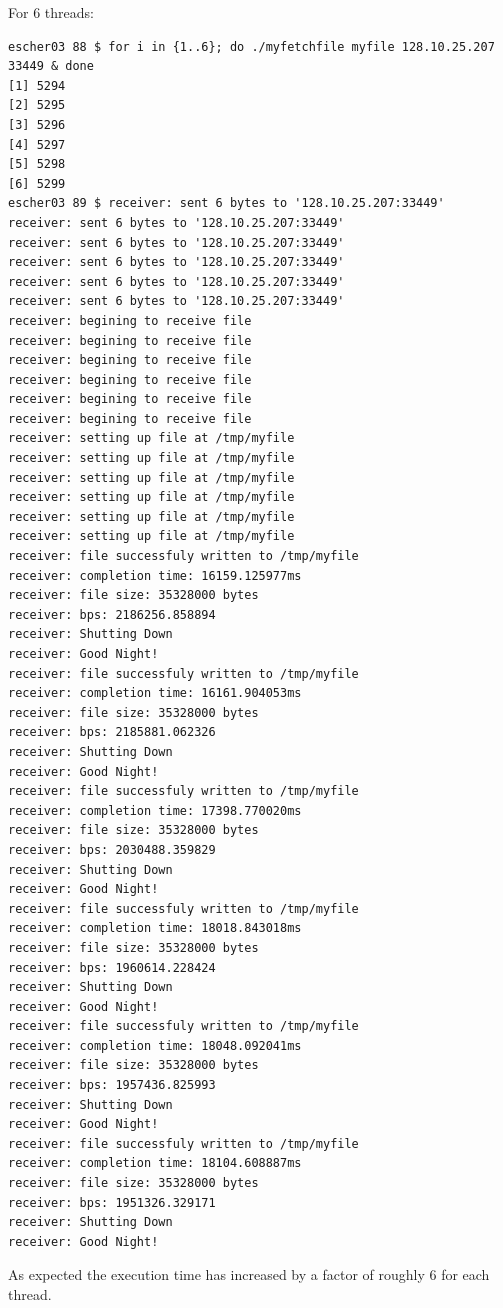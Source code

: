 \documentclass[paper=a4, fontsize=11pt]{scrartcl}
\numberwithin{equation}{section}		%
\numberwithin{figure}{section}			%
\numberwithin{table}{section}				%
\begin{document}
For 6 threads:
\begin{verbatim}
escher03 88 $ for i in {1..6}; do ./myfetchfile myfile 128.10.25.207 33449 & done
[1] 5294
[2] 5295
[3] 5296
[4] 5297
[5] 5298
[6] 5299
escher03 89 $ receiver: sent 6 bytes to '128.10.25.207:33449'
receiver: sent 6 bytes to '128.10.25.207:33449'
receiver: sent 6 bytes to '128.10.25.207:33449'
receiver: sent 6 bytes to '128.10.25.207:33449'
receiver: sent 6 bytes to '128.10.25.207:33449'
receiver: sent 6 bytes to '128.10.25.207:33449'
receiver: begining to receive file
receiver: begining to receive file
receiver: begining to receive file
receiver: begining to receive file
receiver: begining to receive file
receiver: begining to receive file
receiver: setting up file at /tmp/myfile
receiver: setting up file at /tmp/myfile
receiver: setting up file at /tmp/myfile
receiver: setting up file at /tmp/myfile
receiver: setting up file at /tmp/myfile
receiver: setting up file at /tmp/myfile
receiver: file successfuly written to /tmp/myfile
receiver: completion time: 16159.125977ms
receiver: file size: 35328000 bytes
receiver: bps: 2186256.858894
receiver: Shutting Down
receiver: Good Night!
receiver: file successfuly written to /tmp/myfile
receiver: completion time: 16161.904053ms
receiver: file size: 35328000 bytes
receiver: bps: 2185881.062326
receiver: Shutting Down
receiver: Good Night!
receiver: file successfuly written to /tmp/myfile
receiver: completion time: 17398.770020ms
receiver: file size: 35328000 bytes
receiver: bps: 2030488.359829
receiver: Shutting Down
receiver: Good Night!
receiver: file successfuly written to /tmp/myfile
receiver: completion time: 18018.843018ms
receiver: file size: 35328000 bytes
receiver: bps: 1960614.228424
receiver: Shutting Down
receiver: Good Night!
receiver: file successfuly written to /tmp/myfile
receiver: completion time: 18048.092041ms
receiver: file size: 35328000 bytes
receiver: bps: 1957436.825993
receiver: Shutting Down
receiver: Good Night!
receiver: file successfuly written to /tmp/myfile
receiver: completion time: 18104.608887ms
receiver: file size: 35328000 bytes
receiver: bps: 1951326.329171
receiver: Shutting Down
receiver: Good Night!
\end{verbatim}

As expected the execution time has increased by a factor of roughly 6 for each thread.
\end{document}
